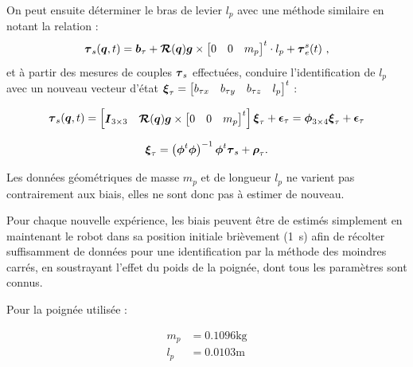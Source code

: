 \begin{appendices}
	On peut ensuite déterminer le bras de levier $l_p$ avec une méthode similaire en notant la relation :
	\begin{equation}
		\vect{\tau}_s(\vect{q}, t) = \vect{b}_\tau + \boldsymbol{\mathcal{R}}(\vect{q}) \vect{g} \times  \begin{bmatrix}0&0&m_p\end{bmatrix}^t \cdot l_p + \vect{\tau}_e^s(t) \text{ ,}
	\end{equation}
	et à partir des mesures de couples $\vect{\tau}_s$ effectuées, conduire l'identification de $l_p$ avec un nouveau vecteur d'état $\vect{\xi}_\tau = \begin{bmatrix} b_{\tau x} & b_{\tau y} & b_{\tau z} & l_p \end{bmatrix}^t$ :
	
	\begin{equation}
		\vect{\tau}_s(\vect{q}, t) = \begin{bmatrix}\matr{I}_{3\times3} & \boldsymbol{\mathcal{R}}(\vect{q})\vect{g} \times  \begin{bmatrix}0&0&m_p\end{bmatrix}^t\end{bmatrix} \vect{\xi}_\tau + \vect{\epsilon}_\tau = \matr{\phi}_{3\times4} \vect{\xi}_\tau + \vect{\epsilon}_\tau
	\end{equation}
	
	\begin{equation}
		\vect{\xi}_\tau = \left(\matr{\phi}^t\matr{\phi}\right)^{-1} \matr{\phi}^t \vect{\tau}_s + \vect{\rho}_\tau \text{.}
	\end{equation}
	
	Les données géométriques de masse $m_p$ et de longueur $l_p$ ne varient pas contrairement aux biais, elles ne sont donc pas à estimer de nouveau.
	
	Pour chaque nouvelle expérience, les biais peuvent être de estimés simplement en maintenant le robot dans sa position initiale brièvement (\SI{1}{\second}) afin de récolter suffisamment de données pour une identification par la méthode des moindres carrés, en soustrayant l'effet du poids de la poignée, dont tous les paramètres sont connus.
	
	Pour la poignée utilisée :
	
	\begin{equation}
		\begin{aligned}
			m_p &= 0.1096 \si{\kilogram}\\
			l_p &= 0.0103 \si{\meter}
		\end{aligned}
	\end{equation}
	

\end{appendices}
